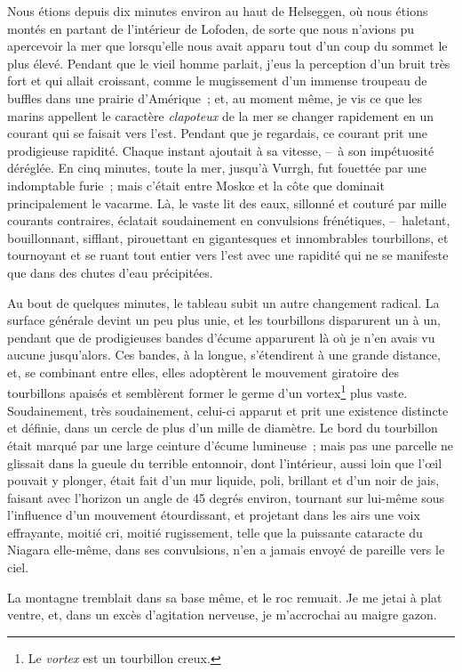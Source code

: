 \documentclass[french,twoside]{book} %
\begin{document}
Nous étions depuis dix minutes environ au haut de Helseggen, où nous étions montés en partant de l’intérieur de Lofoden, de sorte que nous n’avions pu apercevoir la mer que lorsqu’elle nous avait apparu tout d’un coup du sommet le plus élevé. Pendant que le vieil homme parlait, j’eus la perception d’un bruit très fort et qui allait croissant, comme le mugissement d’un immense troupeau de buffles dans une prairie d’Amérique ; et, au moment même, je vis ce que les marins appellent le caractère \emph{clapoteux} de la mer se changer rapidement en un courant qui se faisait vers l’est. Pendant que je regardais, ce courant prit une prodigieuse rapidité. Chaque instant ajoutait à sa vitesse, – à son impétuosité déréglée. En cinq minutes, toute la mer, jusqu’à Vurrgh, fut fouettée par une indomptable furie ; mais c’était entre Moskœ et la côte que dominait principalement le vacarme. Là, le vaste lit des eaux, sillonné et couturé par mille courants contraires, éclatait soudainement en convulsions frénétiques, – haletant, bouillonnant, sifflant, pirouettant en gigantesques et innombrables tourbillons, et tournoyant et se ruant tout entier vers l’est avec une rapidité qui ne se manifeste que dans des chutes d’eau précipitées.\par
Au bout de quelques minutes, le tableau subit un autre changement radical. La surface générale devint un peu plus unie, et les tourbillons disparurent un à un, pendant que de prodigieuses bandes d’écume apparurent là où je n’en avais vu aucune jusqu’alors. Ces bandes, à la longue, s’étendirent à une grande distance, et, se combinant entre elles, elles adoptèrent le mouvement giratoire des tourbillons apaisés et semblèrent former le germe d’un vortex\footnote{Le \emph{vortex} est un tourbillon creux.} plus vaste. Soudainement, très soudainement, celui-ci apparut et prit une existence distincte et définie, dans un cercle de plus d’un mille de diamètre. Le bord du tourbillon était marqué par une large ceinture d’écume lumineuse ; mais pas une parcelle ne glissait dans la gueule du terrible entonnoir, dont l’intérieur, aussi loin que l’œil pouvait y plonger, était fait d’un mur liquide, poli, brillant et d’un noir de jais, faisant avec l’horizon un angle de 45 degrés environ, tournant sur lui-même sous l’influence d’un mouvement étourdissant, et projetant dans les airs une voix effrayante, moitié cri, moitié rugissement, telle que la puissante cataracte du Niagara elle-même, dans ses convulsions, n’en a jamais envoyé de pareille vers le ciel.\par
La montagne tremblait dans sa base même, et le roc remuait. Je me jetai à plat ventre, et, dans un excès d’agitation nerveuse, je m’accrochai au maigre gazon.\par
\end{document}
